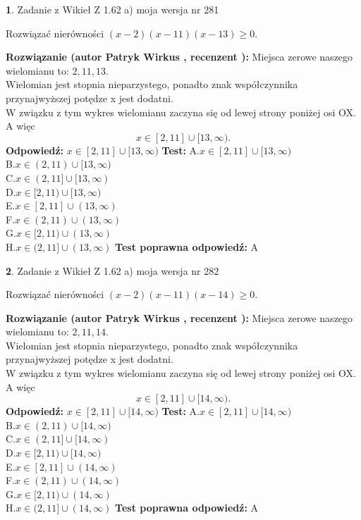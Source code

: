 \documentclass[12pt, a4paper]{article}
\theoremstyle{definition} %
\newtheorem{zad}{}
\newcommand{\zadStart}[1]{\begin{zad}#1\newline}
\newcommand{\zadStop}{\end{zad}}
\newcommand{\rozwStart}[2]{\noindent \textbf{Rozwiązanie (autor #1 , recenzent #2): }\newline}
\newcommand{\rozwStop}{\newline}
\newcommand{\odpStart}{\noindent \textbf{Odpowiedź:}\newline}
\newcommand{\odpStop}{\newline}
\newcommand{\testStart}{\noindent \textbf{Test:}\newline}
\newcommand{\testStop}{\newline}
\newcommand{\kluczStart}{\noindent \textbf{Test poprawna odpowiedź:}\newline}
\newcommand{\kluczStop}{\newline}
\begin{document}
\zadStart{Zadanie z Wikieł Z 1.62 a) moja wersja nr 281}

Rozwiązać nierówności $(x-2)(x-11)(x-13)\ge0$.
\zadStop
\rozwStart{Patryk Wirkus}{}
Miejsca zerowe naszego wielomianu to: $2, 11, 13$.\\
Wielomian jest stopnia nieparzystego, ponadto znak współczynnika przy\linebreak najwyższej potędze x jest dodatni.\\ W związku z tym wykres wielomianu zaczyna się od lewej strony poniżej osi OX. A więc $$x \in [2,11] \cup [13,\infty).$$
\rozwStop
\odpStart
$x \in [2,11] \cup [13,\infty)$
\odpStop
\testStart
A.$x \in [2,11] \cup [13,\infty)$\\
B.$x \in (2,11) \cup [13,\infty)$\\
C.$x \in (2,11] \cup [13,\infty)$\\
D.$x \in [2,11) \cup [13,\infty)$\\
E.$x \in [2,11] \cup (13,\infty)$\\
F.$x \in (2,11) \cup (13,\infty)$\\
G.$x \in [2,11) \cup (13,\infty)$\\
H.$x \in (2,11] \cup (13,\infty)$
\testStop
\kluczStart
A
\kluczStop



\zadStart{Zadanie z Wikieł Z 1.62 a) moja wersja nr 282}

Rozwiązać nierówności $(x-2)(x-11)(x-14)\ge0$.
\zadStop
\rozwStart{Patryk Wirkus}{}
Miejsca zerowe naszego wielomianu to: $2, 11, 14$.\\
Wielomian jest stopnia nieparzystego, ponadto znak współczynnika przy\linebreak najwyższej potędze x jest dodatni.\\ W związku z tym wykres wielomianu zaczyna się od lewej strony poniżej osi OX. A więc $$x \in [2,11] \cup [14,\infty).$$
\rozwStop
\odpStart
$x \in [2,11] \cup [14,\infty)$
\odpStop
\testStart
A.$x \in [2,11] \cup [14,\infty)$\\
B.$x \in (2,11) \cup [14,\infty)$\\
C.$x \in (2,11] \cup [14,\infty)$\\
D.$x \in [2,11) \cup [14,\infty)$\\
E.$x \in [2,11] \cup (14,\infty)$\\
F.$x \in (2,11) \cup (14,\infty)$\\
G.$x \in [2,11) \cup (14,\infty)$\\
H.$x \in (2,11] \cup (14,\infty)$
\testStop
\kluczStart
A
\kluczStop
\end{document}
